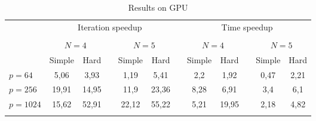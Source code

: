\documentclass{svproc}
\begin{document}
\begin{table}
                \caption{Results on GPU}
                \label{table:average_AS_GPU}
                \center
                \begin{tabular}{lccccccccccc}
																& \multicolumn{5}{c}{ Iteration speedup} & & \multicolumn{5}{c}{ Time speedup}\\
                               \noalign{\smallskip} \cline{2-6} \cline{8-12}  \\
                               & \multicolumn{2}{c}{ $N=4$ } & & \multicolumn{2}{c}{$N=5$} &  & \multicolumn{2}{c}{ $N=4$ } & & \multicolumn{2}{c}{$N=5$} \\
                               \noalign{\smallskip} \cline{2-3} \cline{5-6}  \cline{8-9} \cline{11-12} \noalign{\smallskip}
                               & Simple & Hard & & Simple & Hard &  & Simple & Hard & & Simple & Hard  \\
                               \noalign{\smallskip} \hline \noalign{\smallskip}                               
                               $p=64$  &    5,06  & 3,93  &   & 1,19 	 & 5,41  &   & 2,2	    & 1,92	 &   & 0,47	& 2,21 \\
                               $p=256$ &    19,91 & 14,95 &   & 11,9 	 & 23,36 &   & 8,28	& 6,91	     &   & 3,4	    & 6,1 \\
							   $p=1024$&    15,62 & 52,91 &   & 22,12	 & 55,22 &   & 5,21	& 19,95      &   & 2,18	& 4,82 \\
                               \noalign{\smallskip}\hline
                \end{tabular}
\end{table}
\end{document}
